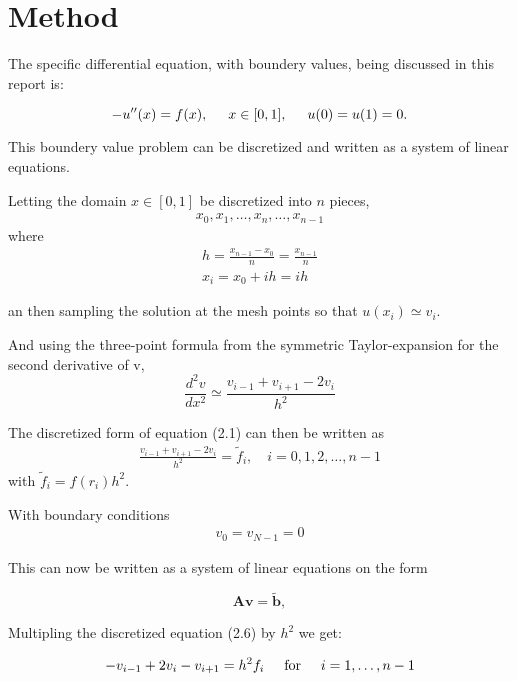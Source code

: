 \documentclass[11pt,a4paper,english,final]{article}
\numberwithin{equation}{section}
\newcommand{\ve}[1]{\mathbf{#1}} %
\newcommand{\spac}{\hspace{5mm}}
\begin{document}
\section{Method}

The specific differential equation, with boundery values, being discussed in this report is: 

\begin{equation}
-u''(x) = f(x), \spac x \in [0,1], \spac u(0) = u(1) = 0.
\end{equation}

This boundery value problem can be discretized and written as a system of linear equations.

Letting the domain $x \in [0,1]$ be discretized into $n$ pieces,
\begin{gather}
x_0, x_1, \dots, x_{n}, \dots, x_{n-1}
\end{gather}
where 
\begin{gather}
h = \frac{x_{n-1} - x_0}{n} = \frac{x_{n-1}}{n}\\
x_i = x_0 + ih = ih
\end{gather}

an then sampling the solution at the mesh points so that $u(x_i) \simeq v_i$.

And using the three-point formula from the symmetric 
Taylor-expansion for the second derivative of v,
\begin{equation}
\frac{d^2v}{dx^2} \simeq \frac{v_{i-1} + v_{i+1} - 2v_i}{h^2}
\end{equation}

The discretized form of equation (2.1) can then be written as
\begin{gather}
\frac{v_{i-1} + v_{i+1} - 2v_i}{h^2} = \tilde{f}_i , \quad i=0,1,2, \dots, n-1 
\end{gather}
with $\tilde{f}_i = f(r_i) h^2$.

With boundary conditions 
\begin{gather}
v_0 = v_{N-1} = 0
\end{gather}

This can now be written as a system of linear equations on the form 

\begin{equation}
   \ve{A}\ve{v} = \tilde{\ve{b}},
   \label{eq:Avb}
\end{equation}

Multipling the discretized equation (2.6) by $h^2$ we get:

\begin{gather*}
   -v_{i-1}+2v_{i}-v_{i+1}=h^2 f_i \hspace{0.5cm} \mathrm{for} \hspace{0.5cm} i=1,\dots, n-1 
\end{gather*}
\end{document}
